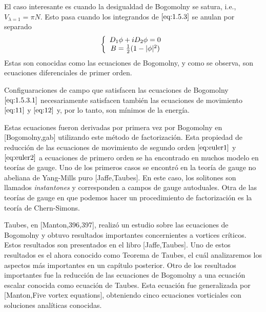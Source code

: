  El caso interesante es cuando la desigualdad de Bogomolny se satura, i.e., $V_{\lambda=1}=\pi N$. Esto pasa cuando los integrandos de $\eqref{eq:1.5.3}$ se anulan por separado
 \begin{align}
     \left\{\begin{array}{c}
          D_1\phi+iD_2\phi = 0  \\
          B = \frac{1}{2}(1-|\phi|^2)
     \end{array}\right. \label{eq:1.5.3.1}
 \end{align}
 Estas son conocidas como las ecuaciones de Bogomolny, y como se observa, son ecuaciones diferenciales de primer orden.
 
 Configuaraciones de campo que satisfacen las ecuaciones de Bogomolny $\eqref{eq:1.5.3.1}$  necesariamente satisfacen también las ecuaciones de movimiento $\eqref{eq:11}$ y $\eqref{eq:12}$ y, por lo tanto, son mínimos de la energía.
 
 Estas ecuaciones fueron derivadas por primera vez por Bogomolny en [Bogomolny,gab] utilizando este método de factorización. Esta propiedad de reducción de las ecuaciones de movimiento de segundo orden $\eqref{eq:euler1}$ y $\eqref{eq:euler2}$ a ecuaciones de primero orden se ha encontrado en muchos modelo en teorías de gauge. Uno de los primeros casos se encontró en la teoría de gauge no abeliana de Yang-Mills puro [Jaffe,Taubes]. En este caso, los solitones son llamados \emph{instantones} y corresponden a campos de gauge autoduales.
 Otra de las teorías de gauge en que podemos hacer un procedimiento de factorización es la teoría de Chern-Simons.
 
 Taubes, en [Manton,396,397], realizó un estudio sobre las ecuaciones de Bogomolny y obtuvo resultados importantes concernientes a vortices críticos. Estos resultados son presentados en el libro [Jaffe,Taubes]. Uno de estos resultados es el ahora conocido como Teorema de Taubes, el cuál analizaremos los aspectos más importantes en un capítulo posterior. Otro de los resultados importantes fue la reducción de las ecuaciones de Bogomolny a una ecuación escalar conocida como ecuación de Taubes. Esta ecuación fue generalizada por [Manton,Five vortex equations], obteniendo cinco ecuaciones vorticiales con soluciones analíticas conocidas.
 
 
 
